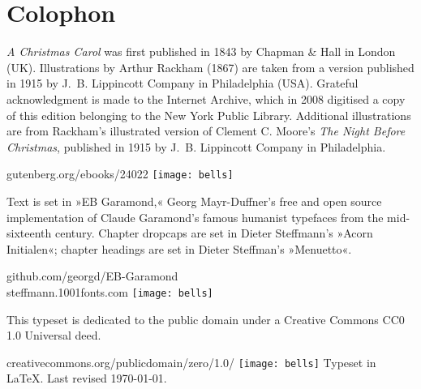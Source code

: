 \documentclass[
a5paper,
]{scrbook} %
\begin{document}
\chapter*{Colophon}
\vfill
\centering
\begin{minipage}{\textwidth}
\textit{A Christmas Carol} was first published in 1843 by Chapman \& Hall in London (UK). Illustrations by Arthur Rackham (1867) are taken from a version published in 1915 by J.~B. Lippincott Company in Philadelphia (USA). Grateful acknowledgment is made to the Internet Archive, which in 2008 digitised a copy of this edition belonging to the New York Public Library. Additional illustrations are from Rackham's illustrated version of Clement C. Moore's \textit{The Night Before Christmas}, published in 1915 by J.~B. Lippincott Company in Philadelphia.
\end{minipage}
\vfill
gutenberg.org/ebooks/24022
\vfill
\texttt{[image: bells]}
\vfill
\begin{minipage}{\textwidth}
Text is set in »EB Garamond,« Georg Mayr-Duffner's free and open source implementation of Claude Garamond’s famous humanist typefaces from the mid-sixteenth century. Chapter dropcaps are set in Dieter Steffmann's »Acorn Initialen«; chapter headings are set in Dieter Steffman's »Menuetto«.
\end{minipage}
\vfill
github.com/georgd/EB-Garamond
\\steffmann.1001fonts.com
\vfill
\texttt{[image: bells]}
\vfill
\begin{minipage}{\textwidth}
This typeset is dedicated to the public domain under a Creative Commons CC0 1.0 Universal deed.
\end{minipage}
\vfill
creativecommons.org/publicdomain/zero/1.0/
\vfill
\texttt{[image: bells]}
\vfill
Typeset in \LaTeX{}. Last revised \today.
\thispagestyle{empty}
\end{document}
